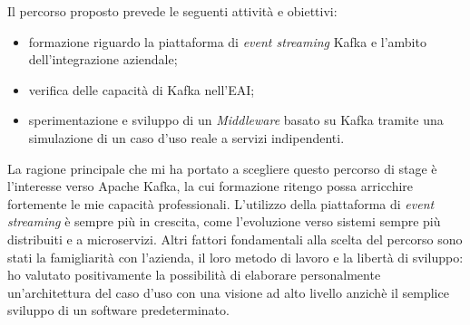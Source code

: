 \bigskip\noindent
Il percorso proposto prevede le seguenti attività e obiettivi:
\begin{itemize}
  \item formazione riguardo la piattaforma di \textit{event streaming} Kafka e l'ambito dell'integrazione aziendale;
  \item verifica delle capacità di Kafka nell'EAI;
  \item sperimentazione e sviluppo di un \textit{Middleware} basato su Kafka tramite una simulazione di un caso d'uso reale a servizi indipendenti.
\end{itemize}

La ragione principale che mi ha portato a scegliere questo percorso di stage è l'interesse verso Apache Kafka, la cui formazione ritengo possa arricchire fortemente le mie capacità professionali.
L'utilizzo della piattaforma di \textit{event streaming} è sempre più in crescita, come l'evoluzione verso sistemi sempre più distribuiti e a microservizi.
Altri fattori fondamentali alla scelta del percorso sono stati la famigliarità con l'azienda, il loro metodo di lavoro e la libertà di sviluppo: ho valutato positivamente la possibilità di elaborare personalmente un'architettura del caso d'uso con una visione ad alto livello anzichè il semplice sviluppo di un software predeterminato.
